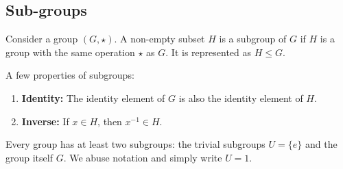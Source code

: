 \documentclass[12pt, oneside]{book}
\begin{document}
\subsection{Sub-groups}
Consider a group \( \left(G, \star \right) \).
A non-empty subset \(H\) is a subgroup of \(G\) if \(H\) is a group with the same operation \(\star\) as \(G\).
It is represented as \(H \leq G\).

A few properties of subgroups:
\begin{enumerate}
    \item \textbf{Identity:} The identity element of \(G\) is also the identity element of \(H\).
    \item \textbf{Inverse:} If \(x \in H\), then \(x^{-1} \in H\).
\end{enumerate}
Every group has at least two subgroups: the trivial subgroups \(U = \{e\}\) and the group itself \(G\).
We abuse notation and simply write \(U = 1\).
\end{document}
